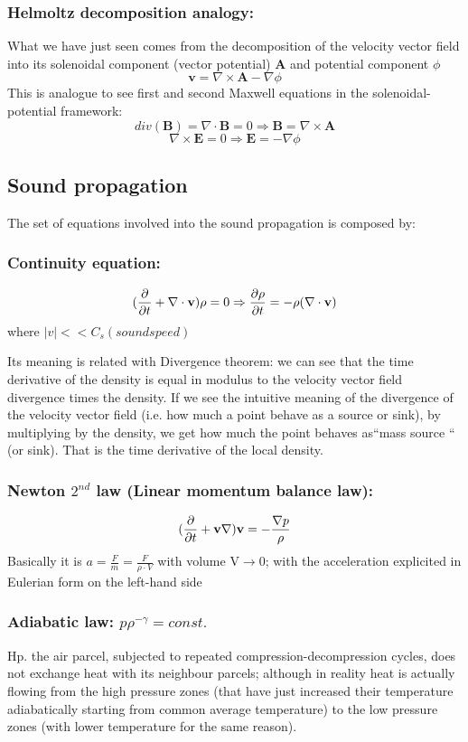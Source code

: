 \documentclass[a4paper,11pt]{article}
\begin{document}
\subsubsection{Helmoltz decomposition analogy:}
What we have just seen comes from the decomposition of the velocity vector field into its solenoidal component (vector potential) \textbf{A} and potential component $\phi$
\[  \mathbf{v}=\nabla \times \mathbf{A}-\nabla\phi \]
This is analogue to see first and second Maxwell equations in the solenoidal-potential framework:
\[  div(\mathbf{B})=\nabla \cdot \mathbf{B}=0 \Rightarrow \mathbf{B}=\nabla\times \mathbf{A} \]
\[  \nabla \times \mathbf{E}=0 \Rightarrow \mathbf{E}=-\nabla\phi  \]



\subsection{Sound propagation}
The set of equations involved into the sound propagation is composed by:
\subsubsection{Continuity equation:}
\[  (\pdv{}{t}+\nabla \cdot \mathbf{v})\rho=0 \Rightarrow \pdv{\rho}{t}=- \rho ( \nabla \cdot \mathbf{v})     \] where $|v|<<C_s (sound speed)$

Its meaning is related with Divergence theorem: %
we can see that the time derivative of the density is equal in modulus to the velocity vector field divergence times the density. 
If we see the intuitive meaning of the divergence of the velocity vector field (i.e. how much a point behave as a source or sink), by multiplying by the density, we get how much the point behaves as``mass source `` (or sink). 
That is the time derivative of the local density.
\subsubsection{ Newton $2^{nd}$ law (Linear momentum balance law):}
\[   (\pdv{}{t}+\mathbf{v}\nabla)\mathbf{v}=- \frac{\nabla p}{\rho} \]
Basically it is $a=\frac{F}{m}=\frac{F}{\rho \cdot V}$ with volume V$\rightarrow 0$; with the acceleration explicited in Eulerian form on the left-hand side
\subsubsection{Adiabatic law: $p \rho^{-\gamma}=const.$}
Hp. the air parcel, subjected to repeated compression-decompression cycles, does not exchange heat with its neighbour parcels; although in reality heat is actually flowing from the high pressure zones (that have just increased their temperature adiabatically starting from common average temperature) to the low pressure zones (with lower temperature for the same reason).
\end{document}

